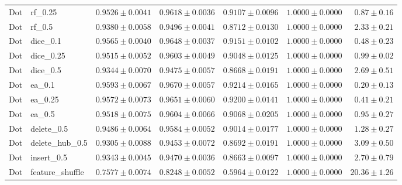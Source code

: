 \documentclass[UTF8,a4paper,11pt,fontset=fandol]{ctexart}
\begin{document}
{\begin{longtable}{llrrrrr}
Dot & rf\_0.25 & $0.9526\pm0.0041$ & $0.9618\pm0.0036$ & $0.9107\pm0.0096$ & $1.0000\pm0.0000$ & $0.87\pm0.16$ \\
Dot & rf\_0.5 & $0.9380\pm0.0058$ & $0.9496\pm0.0041$ & $0.8712\pm0.0130$ & $1.0000\pm0.0000$ & $2.33\pm0.21$ \\
Dot & dice\_0.1 & $0.9565\pm0.0040$ & $0.9648\pm0.0037$ & $0.9151\pm0.0102$ & $1.0000\pm0.0000$ & $0.48\pm0.23$ \\
Dot & dice\_0.25 & $0.9515\pm0.0052$ & $0.9603\pm0.0049$ & $0.9048\pm0.0125$ & $1.0000\pm0.0000$ & $0.99\pm0.02$ \\
Dot & dice\_0.5 & $0.9344\pm0.0070$ & $0.9475\pm0.0057$ & $0.8668\pm0.0191$ & $1.0000\pm0.0000$ & $2.69\pm0.51$ \\
Dot & ea\_0.1 & $0.9593\pm0.0067$ & $0.9670\pm0.0057$ & $0.9214\pm0.0165$ & $1.0000\pm0.0000$ & $0.20\pm0.13$ \\
Dot & ea\_0.25 & $0.9572\pm0.0073$ & $0.9651\pm0.0060$ & $0.9200\pm0.0141$ & $1.0000\pm0.0000$ & $0.41\pm0.21$ \\
Dot & ea\_0.5 & $0.9518\pm0.0075$ & $0.9604\pm0.0066$ & $0.9068\pm0.0205$ & $1.0000\pm0.0000$ & $0.95\pm0.27$ \\
Dot & delete\_0.5 & $0.9486\pm0.0064$ & $0.9584\pm0.0052$ & $0.9014\pm0.0177$ & $1.0000\pm0.0000$ & $1.28\pm0.27$ \\
Dot & delete\_hub\_0.5 & $0.9305\pm0.0088$ & $0.9453\pm0.0072$ & $0.8692\pm0.0191$ & $1.0000\pm0.0000$ & $3.09\pm0.50$ \\
Dot & insert\_0.5 & $0.9343\pm0.0045$ & $0.9470\pm0.0036$ & $0.8663\pm0.0097$ & $1.0000\pm0.0000$ & $2.70\pm0.79$ \\
Dot & feature\_shuffle & $0.7577\pm0.0074$ & $0.8248\pm0.0052$ & $0.5964\pm0.0122$ & $1.0000\pm0.0000$ & $20.36\pm1.26$ \\
\end{longtable}
}
\end{document}
